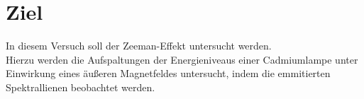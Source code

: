 \section{Ziel}
\label{sec:ziel}
In diesem Versuch soll der Zeeman-Effekt untersucht werden.\\
Hierzu werden die Aufspaltungen der Energieniveaus einer Cadmiumlampe
unter Einwirkung eines äußeren Magnetfeldes untersucht, indem die emmitierten Spektrallienen beobachtet werden.
